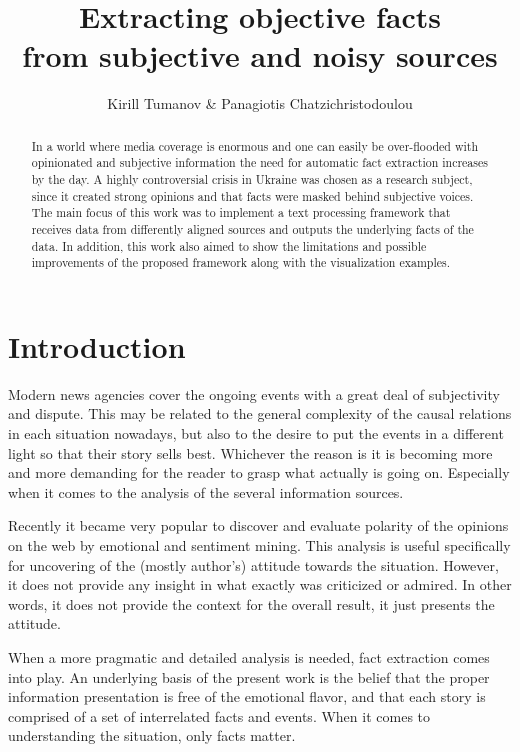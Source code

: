 \documentclass[]{article}
\title{Extracting objective facts \\ from subjective and noisy sources}
\author{Kirill Tumanov \& Panagiotis Chatzichristodoulou}
\begin{document}
\maketitle

\begin{abstract}
\noindent
In a world where media coverage is enormous and one can easily be over-flooded with opinionated and subjective information the need for automatic fact extraction increases by the day. A highly controversial crisis in Ukraine was chosen as a research subject, since it created strong opinions and that facts were masked behind subjective voices. The main focus of this work was to implement a text processing framework that receives data from differently aligned sources and outputs the underlying facts of the data. In addition, this work also aimed to show the limitations and possible improvements of the proposed framework along with the visualization examples.
\end{abstract}

%
\section{Introduction}
%
Modern news agencies cover the ongoing events with a great deal of subjectivity and dispute. This may be related to the general complexity of the causal relations in each situation nowadays, but also to the desire to put the events in a different light so that their story sells best. Whichever the reason is it is becoming more and more demanding for the reader to grasp what actually is going on. Especially when it comes to the analysis of the several information sources.

Recently it became very popular to discover and evaluate polarity of the opinions on the web by emotional and sentiment mining. This analysis is useful specifically for uncovering of the (mostly author's) attitude towards the situation. However, it does not provide any insight in what exactly was criticized or admired. In other words, it does not provide the context for the overall result, it just presents the attitude.

When a more pragmatic and detailed analysis is needed, fact extraction comes into play. An underlying basis of the present work is the belief that the proper information presentation is free of the emotional flavor, and that each story is comprised of a set of interrelated facts and events. When it comes to understanding the situation, only facts matter.
\end{document}
